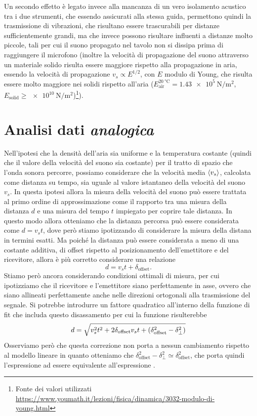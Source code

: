 \documentclass[
    rmp,
    reprint, 
    superscriptaddress, 
    altaffilletter, 
    amsmath, 
    amssymb, 
    a4paper,
    varvw]{revtex4-2}
\begin{document}
Un secondo effetto è legato invece alla mancanza di un vero isolamento acustico tra i due strumenti, che essendo assicurati alla stessa guida, permettono quindi la trasmissione di vibrazioni, che risultano essere trascurabili per distanze sufficientemente grandi, ma che invece possono risultare influenti a distanze molto piccole, tali per cui il suono propagato nel tavolo non si dissipa prima di raggiungere il microfono (inoltre la velocità di propagazione del suono attraverso un materiale solido risulta essere maggiore rispetto alla propagazione in aria, essendo la velocità di propagazione $v_s \propto E^{1/2}$, con $E$ modulo di Young, che risulta essere molto maggiore nei solidi rispetto all'aria ($E_\text{air}^{\SI{20}{\celsius}} = \SI{1.43e5}{\newton\per\metre\squared}$, $E_\text{solid} \geq \SI{e10}{\newton\per\metre\squared}$)\footnote{Fonte dei valori utilizzati  \url{https://www.youmath.it/lezioni/fisica/dinamica/3032-modulo-di-young.html}}). 

\section{Analisi dati \emph{analogica}}

Nell'ipotesi che la densità dell'aria sia uniforme e la temperatura costante (quindi che il valore della velocità del suono sia costante) per il tratto di spazio che l'onda sonora percorre, possiamo considerare che la velocità media $\expval{v_s}$, calcolata come distanza su tempo, sia uguale al valore istantaneo della velocità del suono $v_s$. In questa ipotesi allora la misura della velocità del suono può essere trattata al primo ordine di approssimazione come il rapporto tra una misura della distanza $d$ e una misura del tempo $t$ impiegato per coprire tale distanza. In questo modo allora otteniamo che la distanza percorsa può essere considerata come $d=v_st$, dove però stiamo ipotizzando di considerare la misura della distana in termini esatti. Ma poiché la distanza può essere considerata a meno di una costante additiva, di offset rispetto al posizionamento dell'emettitore e del ricevitore, allora è più corretto considerare una relazione \begin{equation}
    d=v_st + \delta_\text{offset}\label{eq:first_order_approx}.
\end{equation} Stiamo però ancora considerando condizioni ottimali di misura, per cui ipotizziamo che il ricevitore e l'emettitore siano perfettamente in asse, ovvero che siano allineati perfettamente anche nelle direzioni ortogonali alla trasmissione del segnale. Si potrebbe introdurre un fattore quadratico all'interno della funzione di fit che includa questo disassamento per cui la funzione risulterebbe \begin{equation}
    d=\sqrt{v_s^2t^2+2\delta_\text{offset}v_st+\qty(\delta_\text{offset}^2-\delta_\perp^2)} \label{eq:second_order_approx}
\end{equation}
Osserviamo però che questa correzione non porta a nessun cambiamento rispetto al modello lineare in quanto otteniamo che $\delta_\text{offset}^2-\delta_\perp^2 \simeq \delta_\text{offset}^2$, che porta quindi l'espressione  ad essere equivalente all'espressione .
\end{document}
